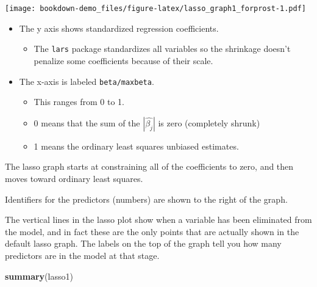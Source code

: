 \documentclass[]{book}
\newenvironment{Shaded}{\begin{snugshade}}{\end{snugshade}}
\newcommand{\KeywordTok}[1]{\textcolor[rgb]{0.13,0.29,0.53}{\textbf{#1}}}
\newcommand{\DataTypeTok}[1]{\textcolor[rgb]{0.13,0.29,0.53}{#1}}
\newcommand{\StringTok}[1]{\textcolor[rgb]{0.31,0.60,0.02}{#1}}
\newcommand{\OperatorTok}[1]{\textcolor[rgb]{0.81,0.36,0.00}{\textbf{#1}}}
\newcommand{\NormalTok}[1]{#1}
\providecommand{\tightlist}{%
  \setlength{\itemsep}{0pt}\setlength{\parskip}{0pt}}
\theoremstyle{definition}
\theoremstyle{definition}
\theoremstyle{definition}
\theoremstyle{remark}
\begin{document}
\begin{Shaded}
\end{Shaded}

\texttt{[image: bookdown-demo\_files/figure-latex/lasso\_graph1\_forprost-1.pdf]}

\begin{itemize}
\tightlist
\item
  The y axis shows standardized regression coefficients.

  \begin{itemize}
  \tightlist
  \item
    The \texttt{lars} package standardizes all variables so the
    shrinkage doesn't penalize some coefficients because of their scale.
  \end{itemize}
\item
  The x-axis is labeled
  \texttt{\textbar{}beta\textbar{}/max\textbar{}beta\textbar{}}.

  \begin{itemize}
  \tightlist
  \item
    This ranges from 0 to 1.
  \item
    0 means that the sum of the \(|\hat{\beta_j}|\) is zero (completely
    shrunk)
  \item
    1 means the ordinary least squares unbiased estimates.
  \end{itemize}
\end{itemize}

The lasso graph starts at constraining all of the coefficients to zero,
and then moves toward ordinary least squares.

Identifiers for the predictors (numbers) are shown to the right of the
graph.

The vertical lines in the lasso plot show when a variable has been
eliminated from the model, and in fact these are the only points that
are actually shown in the default lasso graph. The labels on the top of
the graph tell you how many predictors are in the model at that stage.

\begin{Shaded}
\begin{Highlighting}[]
\KeywordTok{summary}\NormalTok{(lasso1)}
\end{Highlighting}
\end{Shaded}
\end{document}
